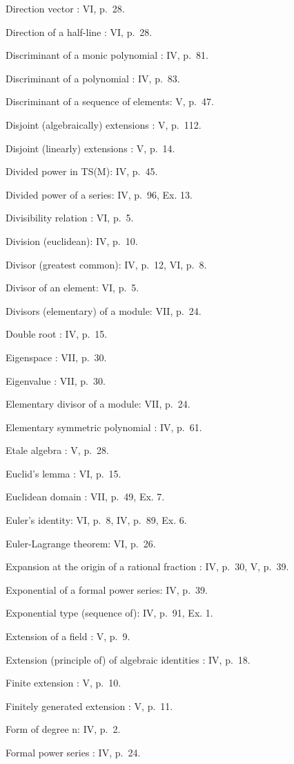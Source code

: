 Direction vector : VI, p.~28.

Direction of a half-line : VI, p.~28.

Discriminant of a monic polynomial : IV, p.~81.

Discriminant of a polynomial : IV, p.~83.

Discriminant of a sequence of elements: V, p.~47.

Disjoint (algebraically) extensions : V, p.~112.

Disjoint (linearly) extensions : V, p.~14.

Divided power in TS(M): IV, p.~45.

Divided power of a series: IV, p.~96, Ex. 13.

Divisibility relation : VI, p.~5.

Division (euclidean): IV, p.~10.

Divisor (greatest common): IV, p.~12, VI, p.~8.

Divisor of an element: VI, p.~5.

Divisors (elementary) of a module: VII, p.~24.

Double root : IV, p.~15.

Eigenspace : VII, p.~30.

Eigenvalue : VII, p.~30.

Elementary divisor of a module: VII, p.~24.

Elementary symmetric polynomial : IV, p.~61.

Etale algebra : V, p.~28.

Euclid's lemma : VI, p.~15.

Euclidean domain : VII, p.~49, Ex. 7.

Euler's identity: VI, p.~8, IV, p.~89, Ex. 6.

Euler-Lagrange theorem: VI, p.~26.

Expansion at the origin of a rational fraction : IV, p.~30, V, p.~39.

Exponential of a formal power series: IV, p.~39.

Exponential type (sequence of): IV, p.~91, Ex. 1.

Extension of a field : V, p.~9.

Extension (principle of) of algebraic identities : IV, p.~18.

Finite extension : V, p.~10.

Finitely generated extension : V, p.~11.

Form of degree n: IV, p.~2.

Formal power series : IV, p.~24.

